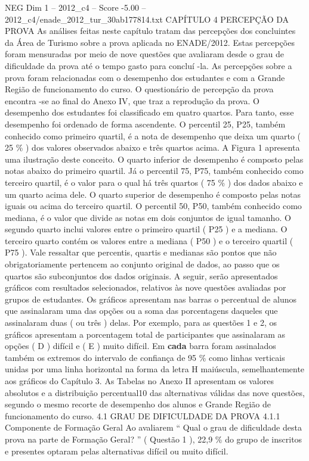 \begin{textsample}{NEG Dim 1 – 2012\_c4 – Score -5.00 – 2012\_c4/enade\_2012\_tur\_30ab177814.txt}  \label{ex:f1_neg_072}
CAPÍTULO 4 PERCEPÇÃO DA PROVA As análises feitas neste capítulo tratam das percepções dos concluintes da Área de Turismo sobre a prova aplicada no ENADE/2012.
Estas percepções foram mensuradas por meio de nove questões que avaliaram desde o grau de dificuldade da prova até o tempo gasto para concluí -la.
As percepções sobre a prova foram relacionadas com o desempenho dos estudantes e com a Grande Região de funcionamento do curso.
O questionário de percepção da prova encontra -se ao final do Anexo IV, que traz a reprodução da prova.
O desempenho dos estudantes foi classificado em quatro quartos.
Para tanto, esse desempenho foi ordenado de forma ascendente.
O percentil 25, P25, também conhecido como primeiro quartil, é a nota de desempenho que deixa um quarto ( 25 \% ) dos valores observados abaixo e três quartos acima.
A Figura 1 apresenta uma ilustração deste conceito.
O quarto inferior de desempenho é composto pelas notas abaixo do primeiro quartil.
Já o percentil 75, P75, também conhecido como terceiro quartil, é o valor para o qual há três quartos ( 75 \% ) dos dados abaixo e um quarto acima dele.
O quarto superior de desempenho é composto pelas notas iguais ou acima do terceiro quartil.
O percentil 50, P50, também conhecido como mediana, é o valor que divide as notas em dois conjuntos de igual tamanho.
O segundo quarto inclui valores entre o primeiro quartil ( P25 ) e a mediana.
O terceiro quarto contém os valores entre a mediana ( P50 ) e o terceiro quartil ( P75 ).
Vale ressaltar que percentis, quartis e medianas são pontos que não obrigatoriamente pertencem ao conjunto original de dados, ao passo que os quartos são subconjuntos dos dados originais.
A seguir, serão apresentados gráficos com resultados selecionados, relativos às nove questões avaliadas por grupos de estudantes.
Os gráficos apresentam nas barras o percentual de alunos que assinalaram uma das opções ou a soma das porcentagens daqueles que assinalaram duas ( ou três ) delas.
Por exemplo, para as questões 1 e 2, os gráficos apresentam a porcentagem total de participantes que assinalaram as opções ( D ) difícil e ( E ) muito difícil.
Em \textbf{cada} barra foram assinalados também os extremos do intervalo de confiança de 95 \% como linhas verticais unidas por uma linha horizontal na forma da letra H maiúscula, semelhantemente aos gráficos do Capítulo 3.
As Tabelas no Anexo II apresentam os valores absolutos e a distribuição percentual10 das alternativas válidas das nove questões, segundo o mesmo recorte de desempenho dos alunos e Grande Região de funcionamento do curso. 4.1 GRAU DE DIFICULDADE DA PROVA 4.1.1 Componente de Formação Geral Ao avaliarem “ Qual o grau de dificuldade desta prova na parte de Formação Geral? ” ( Questão 1 ), 22,9 \% do grupo de inscritos e presentes optaram pelas alternativas difícil ou muito difícil.

\end{textsample}
